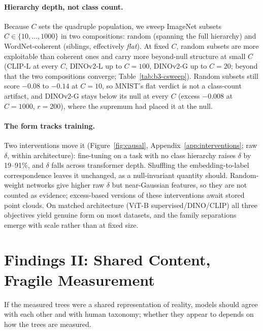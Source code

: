 \paragraph{Hierarchy depth, not class count.} Because $C$ sets the quadruple population, we sweep ImageNet subsets $C\in\{10,\dots,1000\}$ in two compositions: random (spanning the full hierarchy) and WordNet-coherent (siblings, effectively \emph{flat}). At fixed $C$, random subsets are more exploitable than coherent ones and carry more beyond-null structure at small $C$ (CLIP-L at every $C$, DINOv2-L up to $C{=}100$, DINOv2-G up to $C{=}20$; beyond that the two compositions converge; Table~\ref{tab:b3-csweep}). Random subsets still score $-0.08$ to $-0.14$ at $C{=}10$, so MNIST's flat verdict is not a class-count artifact, and DINOv2-G stays below its null at every $C$ (excess $-0.008$ at $C{=}1000$, $r{=}200$), where the supremum had placed it at the null. %

\paragraph{The form tracks training.} Two interventions move it (Figure~\ref{fig:causal}, Appendix~\ref{app:interventions}; raw $\delta$, within architecture): fine-tuning on a task with no class hierarchy raises $\delta$ by 19--91\%, and $\delta$ falls across transformer depth. Shuffling the embedding-to-label correspondence leaves it unchanged, as a null-invariant quantity should. Random-weight networks give higher raw $\delta$ but near-Gaussian features, so they are not counted as evidence; excess-based versions of these interventions await stored point clouds. On matched architecture (ViT-B supervised/DINO/CLIP) all three objectives yield genuine form on most datasets, and the family separations emerge with scale rather than at fixed size. %


\section{Findings II: Shared Content, Fragile Measurement}
\label{sec:content}

If the measured trees were a shared representation of reality, models should agree with each other and with human taxonomy; whether they appear to depends on how the trees are measured.

